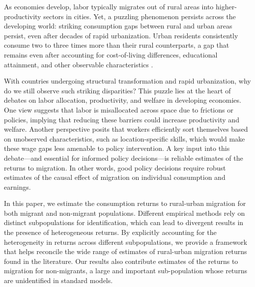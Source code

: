 \documentclass[12pt]{article}
\begin{document}
As economies develop, labor typically migrates out of rural areas into higher-productivity sectors in cities. 
Yet, a puzzling phenomenon persists across the developing world: striking %
consumption gaps between rural and urban areas persist, even after decades of rapid urbanization. 
Urban residents consistently consume two to three times more than their rural counterparts, a gap that remains even after accounting for cost-of-living differences, educational attainment, and other observable characteristics   \citep{youngInequalityUrbanRuralGap2013,gollinAgriculturalProductivityGap2014,herrendorfWagesHumanCapital2018}. 

With countries undergoing structural transformation and rapid urbanization, why do we still observe such striking %
disparities? 
This puzzle lies at the heart of debates on labor allocation, productivity, and welfare in developing economies.
One view suggests that labor is misallocated across space due to frictions or policies, implying that reducing these barriers could increase productivity and welfare. 
Another perspective posits that workers efficiently sort themselves based on unobserved characteristics, such as location-specific skills, which would make these wage gaps less amenable to policy intervention.
A key input into this debate---and essential for informed policy decisions---is reliable estimates of the returns to migration. 
In other words, good policy decisions require robust estimates of the causal effect of migration on individual consumption and earnings.


In this paper, we estimate the consumption returns to rural-urban migration for both migrant and non-migrant populations. 
Different empirical methods rely on distinct subpopulations for identification, which can lead to divergent results in the presence of heterogeneous returns. 
By explicitly accounting for the heterogeneity in returns across different subpopulations, we provide a framework that helps reconcile the wide range of estimates of rural-urban migration returns found in the literature.
Our results also contribute estimates of the returns to migration for non-migrants, a large and important sub-population whose returns are unidentified in standard models. 


\end{document}
